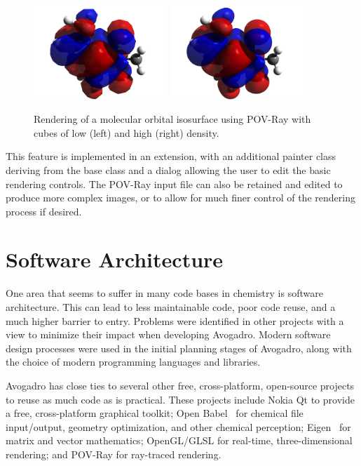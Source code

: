 \documentclass[10pt]{bmc_article}
\newenvironment{bmcformat}{\begin{raggedright}
\baselineskip20pt\sloppy\setboolean{publ}{false}}{\end{raggedright}
\baselineskip20pt\sloppy}
\begin{document}
\begin{bmcformat}
\begin{figure}
  \begin{center}
    \includegraphics[width=0.45\textwidth]{images/caffeine-homo3}
    \includegraphics[width=0.45\textwidth]{images/caffeine-homo4}
  \end{center}
  \caption{Rendering of a molecular orbital isosurface using POV-Ray with cubes
  of low (left) and high (right) density.}
 \label{f:electronic-ray}
\end{figure}

This feature is implemented in an extension, with an additional painter class
deriving from the base class and a dialog allowing the user to edit the basic
rendering controls. The POV-Ray input file can also be retained and edited to
produce more complex images, or to allow for much finer control of the
rendering process if desired.

\section{Software Architecture}

One area that seems to suffer in many code bases in chemistry is software
architecture. This can lead to less maintainable code, poor code reuse, and a
much higher barrier to entry. Problems were identified in other projects with a
view to minimize their impact when developing Avogadro. Modern software design
processes were used in the initial planning stages of Avogadro, along with the
choice of modern programming languages and libraries.

Avogadro has close ties to several other free, cross-platform, open-source
projects to reuse as much code as is practical. These projects include
Nokia Qt to provide a free, cross-platform graphical toolkit; Open
Babel~\cite{OpenBabel} for chemical file input/output, geometry optimization, and
other chemical perception; Eigen~\cite{Eigen} for matrix and vector mathematics;
OpenGL/GLSL for real-time, three-dimensional rendering; and POV-Ray for ray-traced
rendering.


\end{bmcformat}
\end{document}
